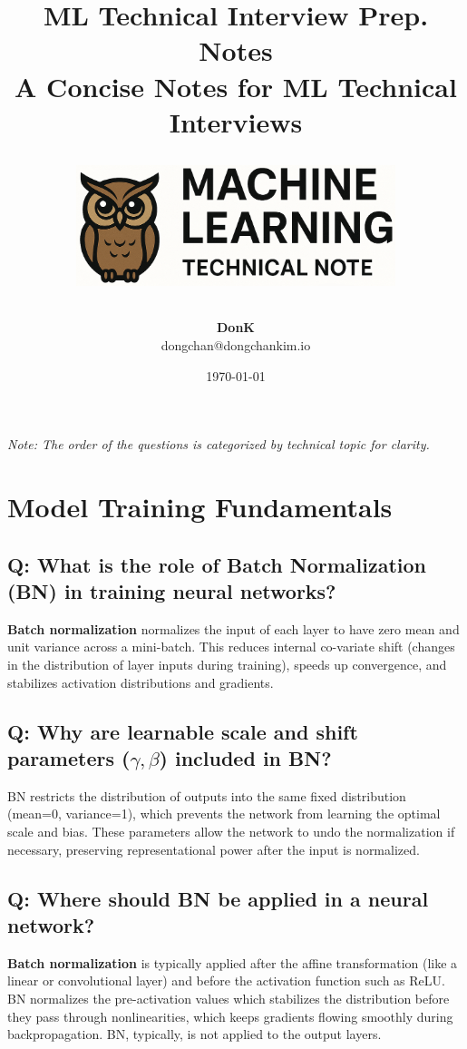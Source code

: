 \documentclass[11pt]{article}
\title{
  \vspace{1cm}
  \Huge\textbf{ML Technical Interview Prep. Notes} \\
  \vspace{0.5cm}
  \large A Concise Notes for ML Technical Interviews \\
  \vspace{5cm}
  \begin{center}
    \includegraphics[width=0.7\textwidth]{p_logo.png}
  \end{center}
  \vspace{5cm}
}
\author{\textbf{DonK} \\
\small dongchan@dongchankim.io}
\date{\today}
\begin{document}
\begin{titlepage}
	\maketitle
	\thispagestyle{empty}
	\vspace*{\fill}
	\small\textit{Note: The order of the questions is categorized by technical topic for clarity.}
\end{titlepage}

\tableofcontents
\thispagestyle{empty}
\newpage


\section{Model Training Fundamentals}

\subsection*{Q: What is the role of Batch Normalization (BN) in training neural networks?}
\textbf{Batch normalization} normalizes the input of each layer to have zero mean and unit variance across a mini-batch. This reduces internal co-variate shift (changes in the distribution of layer inputs during training), speeds up convergence, and stabilizes activation distributions and gradients.

\subsection*{Q: Why are learnable scale and shift parameters (\(\gamma, \beta\)) included in BN?}
BN restricts the distribution of outputs into the same fixed distribution (mean=0, variance=1), which prevents the network from learning the optimal scale and bias. These parameters allow the network to undo the normalization if necessary, preserving representational power after the input is normalized.

\subsection*{Q: Where should BN be applied in a neural network?}
\textbf{Batch normalization} is typically applied after the affine transformation (like a linear or convolutional layer) and before the activation function such as ReLU. BN normalizes the pre-activation values which stabilizes the distribution before they pass through nonlinearities, which keeps gradients flowing smoothly during backpropagation. BN, typically, is not applied to the output layers.
\end{document}
